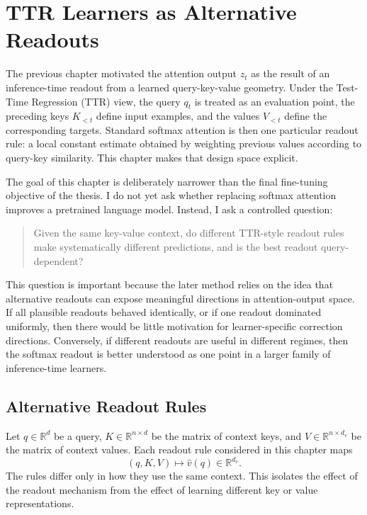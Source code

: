 \chapter{TTR Learners as Alternative Readouts}\label{chap:ttr_learners}

The previous chapter motivated the attention output \(z_t\) as the result of an inference-time readout from a learned query-key-value geometry. Under the Test-Time Regression (TTR) view, the query \(q_t\) is treated as an evaluation point, the preceding keys \(K_{<t}\) define input examples, and the values \(V_{<t}\) define the corresponding targets. Standard softmax attention is then one particular readout rule: a local constant estimate obtained by weighting previous values according to query-key similarity. This chapter makes that design space explicit.

The goal of this chapter is deliberately narrower than the final fine-tuning objective of the thesis. I do not yet ask whether replacing softmax attention improves a pretrained language model. Instead, I ask a controlled question:

\begin{quote}
Given the same key-value context, do different TTR-style readout rules make systematically different predictions, and is the best readout query-dependent?
\end{quote}

This question is important because the later method relies on the idea that alternative readouts can expose meaningful directions in attention-output space. If all plausible readouts behaved identically, or if one readout dominated uniformly, then there would be little motivation for learner-specific correction directions. Conversely, if different readouts are useful in different regimes, then the softmax readout is better understood as one point in a larger family of inference-time learners.

\section{Alternative Readout Rules}\label{sec:alternative_readout_rules}

Let \(q \in \mathbb{R}^{d}\) be a query, \(K \in \mathbb{R}^{n \times d}\) be the matrix of context keys, and \(V \in \mathbb{R}^{n \times d_v}\) be the matrix of context values. Each readout rule considered in this chapter maps
\[
(q, K, V) \mapsto \hat v(q) \in \mathbb{R}^{d_v}.
\]
The rules differ only in how they use the same context. This isolates the effect of the readout mechanism from the effect of learning different key or value representations.

